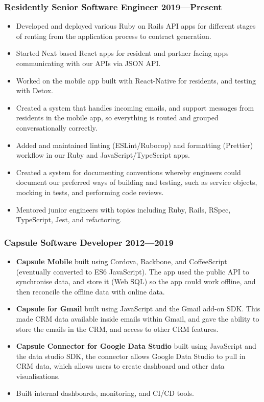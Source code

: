 \documentclass[a4paper]{article}
\newcommand{\datedsubsection}[2]{
  \subsubsection{#1 \hfill \textbf{#2}}
}
\begin{document}
\datedsubsection{\textbf{Residently} Senior Software Engineer}{2019---Present}
\begin{itemize}
  \item Developed and deployed various Ruby on Rails API apps for different stages of renting from the application process to contract generation.
  \item Started Next based React apps for resident and partner facing apps communicating with our APIs via JSON API.
  \item Worked on the mobile app built with React-Native for residents, and testing with Detox.
  \item Created a system that handles incoming emails, and support messages from residents in the mobile app, so everything is routed and grouped conversationally correctly. \item Added and maintained linting (ESLint/Rubocop) and formatting (Prettier) workflow in our Ruby and JavaScript/TypeScript apps.
  \item Created a system for documenting conventions whereby engineers could document our preferred ways of building and testing, such as service objects, mocking in tests, and performing code reviews.
  \item Mentored junior engineers with topics including Ruby, Rails, RSpec, TypeScript, Jest, and refactoring.
\end{itemize}

\datedsubsection{\textbf{Capsule} Software Developer}{2012---2019}
\begin{itemize}
  \item \textbf{Capsule Mobile} built using Cordova, Backbone, and CoffeeScript (eventually converted to ES6 JavaScript). The app used the public API to synchronise data, and store it (Web SQL) so the app could work offline, and then reconcile the offline data with online data.
  \item \textbf{Capsule for Gmail} built using JavaScript and the Gmail add-on SDK. This made CRM  data available inside emails within Gmail, and gave the ability to store the emails in the CRM, and access to other CRM features.
  \item \textbf{Capsule Connector for Google Data Studio} built using JavaScript and the data studio SDK, the connector allows Google Data Studio to pull in CRM data, which allows users to create dashboard and other data visualisations.
  \item Built internal dashboards, monitoring, and CI/CD tools.
\end{itemize}
\end{document}

